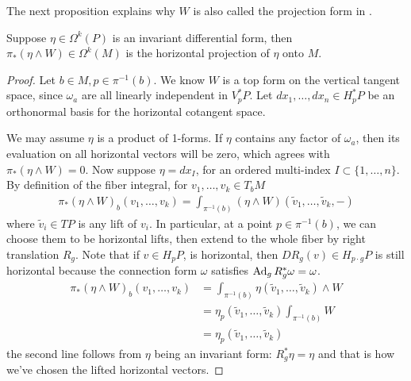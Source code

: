 The next proposition explains why $W$ is also called the projection form in
\cite{cordes95}.
\begin{prop} \label{prop:integral_horizontal_proj}
	Suppose $\eta \in \Omega^k(P)$ is an invariant differential form, then
	 $\pi_*(\eta \wedge W) \in \Omega^k(M)$ is the horizontal projection of 
	 $\eta$ onto $M$.
\end{prop}
\begin{proof}
	Let $b\in M, p\in \pi^{-1}(b)$. 
	We know  $W$ is a top form on the vertical tangent space, 
	since  $\omega_a$ are all linearly independent in $V_p^*P$. Let
	$dx_1,\ldots,dx_n \in H_p^*P$ be an orthonormal basis for the horizontal
	cotangent space. 

	We may assume $\eta$ is a product of 1-forms. If $\eta$ contains any factor of
	$\omega_a$, then its evaluation on all horizontal vectors will be zero, which
	agrees with $\pi_*(\eta\wedge W) = 0$. Now suppose $\eta = dx_I$, for 
	an ordered multi-index $I\subset\{1,\ldots,n\}$.
	By definition of the fiber integral, for $v_1,\ldots,v_k \in T_bM$
	\begin{align*}
		\pi_*(\eta\wedge W)_b(v_1,\ldots,v_k) 
		= \int_{\pi^{-1}(b)} (\eta\wedge W)(\widetilde{v}_1,\ldots,\widetilde{v}_k,-)
	\end{align*}
	where $\widetilde{v}_i \in TP$ is any lift of $v_i$. In particular, at a
	point $p\in \pi^{-1}(b)$, we can choose them to be horizontal lifts, then
	extend to the whole fiber by right translation $R_g$. Note that if  $v\in H_pP$, is
	horizontal, then  $DR_g(v) \in H_{p\cdot g}P$ is still horizontal because 
	the connection form $\omega$ satisfies  $\operatorname{Ad}_g R_g^* \omega = \omega$. 
	\begin{align*}
		\pi_*(\eta\wedge W)_b(v_1,\ldots,v_k) 
		&= \int_{\pi^{-1}(b)} \eta(\widetilde{v}_1,\ldots,\widetilde{v}_k)\wedge W \\
		&= \eta_p(\widetilde{v}_1,\ldots,\widetilde{v}_k)\int_{\pi^{-1}(b)} W \\
		&= \eta_p(\widetilde{v}_1,\ldots,\widetilde{v}_k) 
	\end{align*}
	the second line follows from $\eta$ being an invariant form: 
	$R_g^*\eta = \eta$ and that is how we've chosen the lifted horizontal
	vectors. 
\end{proof}

